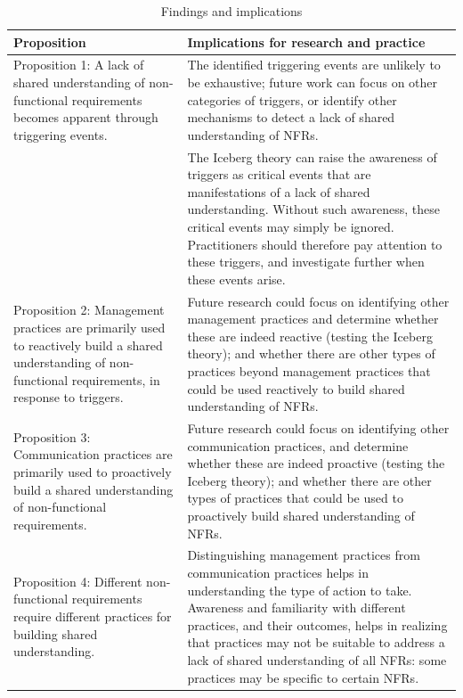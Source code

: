 \documentclass[smallextended]{svjour3}       %
\begin{document}
\begin{table}[!h]

\centering
\caption{Findings and implications}
\label{tab:implications}
\begin{tabular}{p{4cm}p{7cm}} %
    
\toprule 
Proposition  & Implications for research and practice \\
\midrule 

Proposition 1: A lack of shared understanding of non-functional requirements
becomes apparent through triggering events. 
& The identified triggering events are unlikely to be exhaustive; future work can focus on other categories of triggers, or identify other mechanisms to detect a lack of shared understanding of NFRs. 
\\

\addlinespace

& The Iceberg theory can raise the awareness of triggers as critical events that are manifestations of a lack of shared understanding. Without such awareness, these critical events may simply be ignored. Practitioners should therefore pay attention to these triggers, and investigate further when these events arise. \\

\addlinespace 

Proposition 2: Management practices are primarily used to reactively build a
shared understanding of non-functional requirements, in response to triggers.
& 
Future research could focus on identifying other management practices and determine whether these are indeed reactive (testing the Iceberg theory); and whether there are other types of practices beyond management practices that could be used reactively to build shared understanding of NFRs.
\\

\addlinespace 

Proposition 3: Communication practices are primarily used to proactively
build a shared understanding of non-functional requirements.
& Future research could focus on identifying other communication practices, and determine whether these are indeed proactive (testing the Iceberg theory); and whether there are other types of practices that could be used to proactively build shared understanding of NFRs.
\\

\addlinespace 

Proposition 4: Different non-functional requirements require different practices for building shared understanding.
&
Distinguishing management practices from communication practices helps in understanding the type of action to take. 
Awareness and familiarity with different practices, and their outcomes, helps in realizing that practices may not be suitable to address a lack of shared understanding of all NFRs: some practices may be specific to certain NFRs.\\


\end{tabular}
\end{table}
\end{document}
